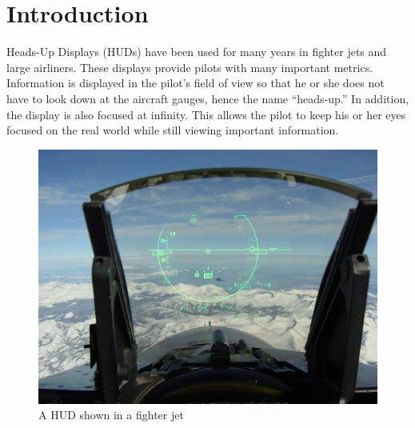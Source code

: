 \chapter{Introduction}




Heads-Up Displays (HUDs) have been used for many years in fighter jets and
large airliners. These displays provide pilots with many important metrics.
Information is displayed in the pilot's field of view so that he or she
does not have to look down at the aircraft gauges, hence the name
``heads-up.'' In addition, the display is also focused at infinity. This
allows the pilot to keep his or her eyes focused on the real world while
still viewing important information.

\begin{figure}[h]
\includegraphics[width=\textwidth]{img/JetHUD.jpg}
\caption{A HUD shown in a fighter jet}
\label{fig:jetHUD}
\end{figure}

